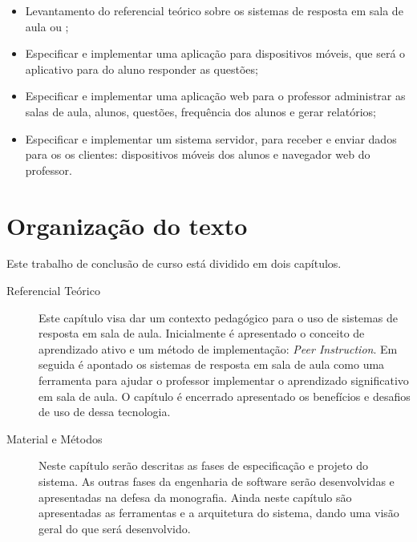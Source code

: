 \begin{itemize}
    \item Levantamento do referencial te\'orico sobre os sistemas de resposta
    em sala de aula ou {\clickers};
    \item Especificar e implementar uma aplicação para dispositivos móveis, que será o
    aplicativo para do aluno responder as questões;
    \item Especificar e implementar uma aplicação web para o professor administrar as
    salas de aula, alunos, questões, frequência dos alunos e gerar relatórios;
    \item Especificar e implementar um sistema servidor, para receber e
    enviar dados para os os clientes: dispositivos móveis dos alunos e navegador
    web do professor.
\end{itemize}

\section{Organização do texto}
Este trabalho de conclusão de curso está dividido em dois capítulos.

\begin{description}
  \item[Referencial Teórico] Este capítulo visa dar um contexto pedagógico
  para o uso de sistemas de resposta em sala de aula. Inicialmente é
  apresentado o conceito de aprendizado ativo e um método de implementação: \textit{Peer Instruction}.
  Em seguida é apontado os sistemas de resposta em sala de aula como uma
  ferramenta para ajudar o professor implementar o aprendizado significativo  em
  sala de aula. O capítulo é encerrado apresentado os benefícios e desafios de uso de dessa tecnologia.

  \item[Material e Métodos] Neste capítulo serão descritas as fases de especificação e projeto do sistema.
  As outras fases da engenharia de software serão desenvolvidas e apresentadas na
  defesa da monografia. Ainda neste capítulo são apresentadas as ferramentas e a arquitetura
  do sistema, dando uma visão geral do que será desenvolvido.

\end{description}
